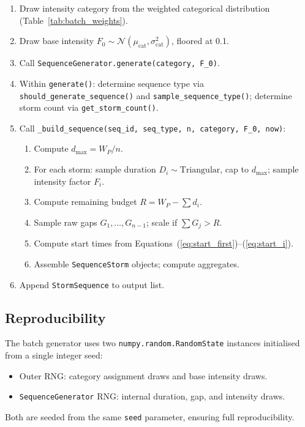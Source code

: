 \documentclass[11pt,a4paper]{article}
\begin{document}
\begin{enumerate}[nosep]
  \item Draw intensity category from the weighted categorical distribution
        (Table~\ref{tab:batch_weights}).
  \item Draw base intensity $F_0 \sim \mathcal{N}(\mu_{\text{cat}}, \sigma_{\text{cat}}^2)$,
        floored at 0.1.
  \item Call \texttt{SequenceGenerator.generate(category, F\_0)}.
  \item Within \texttt{generate()}: determine sequence type via
        \texttt{should\_generate\_sequence()} and \texttt{sample\_sequence\_type()};
        determine storm count via \texttt{get\_storm\_count()}.
  \item Call \texttt{\_build\_sequence(seq\_id, seq\_type, n, category, F\_0, now)}:
    \begin{enumerate}[nosep]
      \item Compute $d_{\max} = W_P / n$.
      \item For each storm: sample duration $D_i \sim \mathrm{Triangular}$, cap to
            $d_{\max}$; sample intensity factor $F_i$.
      \item Compute remaining budget $R = W_P - \sum d_i$.
      \item Sample raw gaps $G_1, \ldots, G_{n-1}$; scale if $\sum G_j > R$.
      \item Compute start times from Equations~(\ref{eq:start_first})--(\ref{eq:start_i}).
      \item Assemble \texttt{SequenceStorm} objects; compute aggregates.
    \end{enumerate}
  \item Append \texttt{StormSequence} to output list.
\end{enumerate}

\subsection{Reproducibility}

The batch generator uses two \texttt{numpy.random.RandomState} instances initialised
from a single integer seed:
\begin{itemize}[nosep]
  \item Outer RNG: category assignment draws and base intensity draws.
  \item \texttt{SequenceGenerator} RNG: internal duration, gap, and intensity draws.
\end{itemize}
Both are seeded from the same \texttt{seed} parameter, ensuring full reproducibility.
\end{document}
